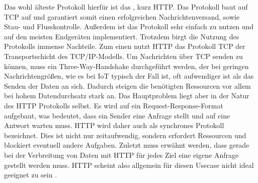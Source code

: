 Das wohl älteste Protokoll hierfür ist das , kurz HTTP. Das Protokoll baut auf TCP auf und garantiert somit einen erfolgreichen Nachrichtenversand, sowie Stau- und Flusskontrolle. Außerdem ist das Protokoll sehr einfach zu nutzen und auf den meisten Endgeräten implementiert. Trotzdem birgt die Nutzung des Protokolls immense Nachteile. Zum einen nutzt HTTP das Protokoll TCP der Transportschicht des TCP/IP-Modells. Um Nachrichten über TCP senden zu können, muss ein Three-Way-Handshake durchgeführt werden, der bei geringen Nachrichtengrößen, wie es bei IoT typisch der Fall ist, oft aufwendiger ist als das Senden der Daten an sich. Dadurch steigen die benötigten Ressourcen vor allem bei hohem Datendurchsatz stark an. Das Hauptproblem liegt aber in der Natur des HTTP Protokolls selbst. Es wird auf ein Request-Response-Format aufgebaut, was bedeutet, dass ein Sender eine Anfrage stellt und auf eine Antwort warten muss. HTTP wird daher auch als synchrones Protokoll bezeichnet. Dies ist nicht nur zeitaufwendig, sondern erfordert Ressourcen und blockiert eventuell andere Aufgaben. Zuletzt muss erwähnt werden, dass gerade bei der Verbreitung von Daten mit HTTP für jedes Ziel eine eigene Anfrage gestellt werden muss. HTTP scheint also allgemein für diesen Usecase nicht ideal geeignet zu sein . 

